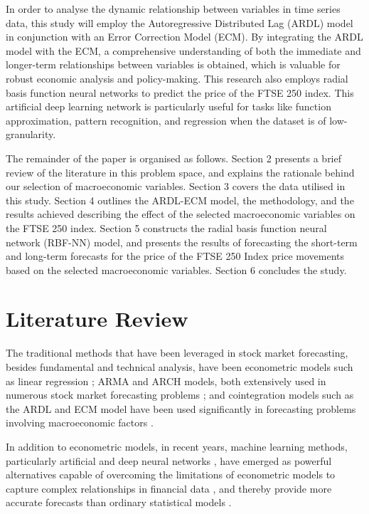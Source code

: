 \documentclass[11pt,a4paper]{article}
\begin{document}
In order to analyse the dynamic relationship between variables in time series data, this study will employ the Autoregressive Distributed Lag (ARDL) model in conjunction with an Error Correction Model (ECM). By integrating the ARDL model with the ECM, a comprehensive understanding of both the immediate and longer-term relationships between variables is obtained, which is valuable for robust economic analysis and policy-making.
This research also employs radial basis function neural networks to predict the price of the FTSE 250 index. This artificial deep learning network is particularly useful for tasks like function approximation, pattern recognition, and regression when the dataset is of low-granularity.

The remainder of the paper is organised as follows. Section 2 presents a brief review of the literature in this problem space, and explains the rationale behind our selection of macroeconomic variables. Section 3 covers the data utilised in this study. Section 4 outlines the ARDL-ECM model, the methodology, and the results achieved describing the effect of the selected macroeconomic variables on the FTSE 250 index. Section 5 constructs the radial basis function neural network (RBF-NN) model, and presents the results of forecasting the short-term and long-term forecasts for the price of the FTSE 250 Index price movements based on the selected macroeconomic variables. Section 6 concludes the study.

\section{Literature Review}

The traditional methods that have been leveraged in stock market forecasting, 
besides fundamental and technical analysis, have been econometric models such as 
linear regression \citep{shakhla2018stock,roy2015stock}; ARMA and ARCH models, both extensively used in numerous stock market forecasting problems \citep{herwartz2017stock,hu2020stock,oberholzer2015garch,rounaghi}; and cointegration models such as the 
ARDL and ECM model have been used significantly in forecasting problems involving macroeconomic factors \citep{demir2019,khan2018,neifar2023}. 

In addition to econometric models, in recent years, machine learning methods, 
particularly artificial and deep neural networks \citep{chen2015lstm,kara2011ann,long2019deep,nelson2017lstm}, have emerged as powerful alternatives capable of overcoming the limitations of econometric models to capture complex relationships in financial data \citep{rossi2018ml}, and thereby provide more accurate forecasts than ordinary statistical models \citep{lapitskaya2021armax}. 
\end{document}
